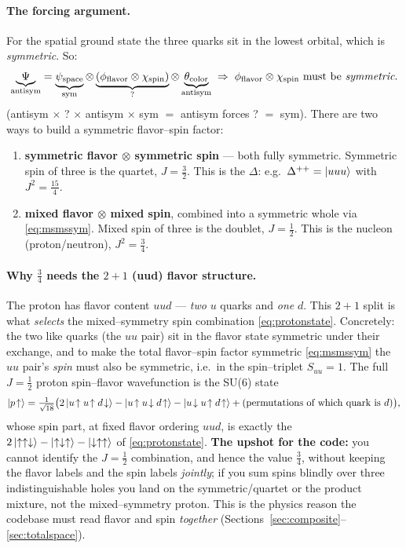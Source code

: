 \documentclass[11pt,oneside]{article}
\newcommand{\up}{\uparrow}
\newcommand{\down}{\downarrow}
\begin{document}
\paragraph{The forcing argument.}
For the spatial ground state the three quarks sit in the lowest orbital, which
is \emph{symmetric}. So:
\begin{equation}
  \underbrace{\Psi}_{\text{antisym}} =
  \underbrace{\psi_{\text{space}}}_{\text{sym}} \otimes
  \underbrace{(\phi_{\text{flavor}}\otimes\chi_{\text{spin}})}_{?} \otimes
  \underbrace{\theta_{\text{color}}}_{\text{antisym}}
  \;\Rightarrow\;
  \phi_{\text{flavor}}\otimes\chi_{\text{spin}} \text{ must be \emph{symmetric}.}
\end{equation}
(antisym $\times$ ? $\times$ antisym $\times$ sym $=$ antisym forces ? $=$ sym).
There are two ways to build a symmetric flavor--spin factor:
\begin{enumerate}[label=(\alph*),leftmargin=2.2em]
  \item \textbf{symmetric flavor $\otimes$ symmetric spin} --- both fully
        symmetric. Symmetric spin of three is the quartet, $J=\tfrac32$. This is
        the $\Delta$: e.g.\ $\Delta^{++}=\ket{uuu}$ with
        $J^2=\tfrac{15}{4}$.
  \item \textbf{mixed flavor $\otimes$ mixed spin}, combined into a symmetric
        whole via \eqref{eq:msmssym}. Mixed spin of three is the doublet,
        $J=\tfrac12$. This is the nucleon (proton/neutron), $J^2=\tfrac34$.
\end{enumerate}

\paragraph{Why $\tfrac34$ needs the $2{+}1$ (uud) flavor structure.}
The proton has flavor content $uud$ --- \emph{two} $u$ quarks and \emph{one}
$d$. This $2{+}1$ split is what \emph{selects} the mixed--symmetry spin
combination \eqref{eq:protonstate}. Concretely: the two like quarks (the $uu$
pair) sit in the flavor state symmetric under their exchange, and to make the
total flavor--spin factor symmetric \eqref{eq:msmssym} the $uu$ pair's
\emph{spin} must also be symmetric, i.e.\ in the spin--triplet $S_{uu}=1$. The
full $J=\tfrac12$ proton spin--flavor wavefunction is the SU(6) state
\begin{equation}
  \ket{p\!\uparrow} = \tfrac{1}{\sqrt{18}}\big(
      2\ket{u\!\up u\!\up d\!\down}
    - \ket{u\!\up u\!\down d\!\up}
    - \ket{u\!\down u\!\up d\!\up} + \text{(permutations of which quark is }d)\big),
  \label{eq:su6}
\end{equation}
whose spin part, at fixed flavor ordering $uud$, is exactly the
$2\ket{\up\up\down}-\ket{\up\down\up}-\ket{\down\up\up}$ of
\eqref{eq:protonstate}. \textbf{The upshot for the code:} you cannot identify
the $J=\tfrac12$ combination, and hence the value $\tfrac34$, without keeping
the flavor labels and the spin labels \emph{jointly}; if you sum spins blindly
over three indistinguishable holes you land on the symmetric/quartet or the
product mixture, not the mixed--symmetry proton. This is the physics reason the
codebase must read flavor and spin \emph{together}
(Sections~\ref{sec:composite}--\ref{sec:totalspace}).
\end{document}
